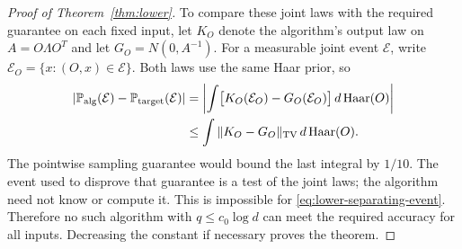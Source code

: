 \begin{proof}[Proof of Theorem~\ref{thm:lower}]
To compare these joint laws with the required guarantee on each fixed
input, let $K_O$ denote the algorithm's output law on $A=O\Lambda O^T$
and let $G_O=N(0,A^{-1})$. For a measurable joint event $\mathcal E$,
write $\mathcal E_O=\{x:(O,x)\in\mathcal E\}$. Both laws use the same
Haar prior, so
\begin{align*}
 \left|\mathbb P_{\mathrm{alg}}(\mathcal E)
       -\mathbb P_{\mathrm{target}}(\mathcal E)\right|
 &=\left|\int\bigl[K_O(\mathcal E_O)-G_O(\mathcal E_O)\bigr]
                   \,d\operatorname{Haar}(O)\right|\\
 &\le\int\|K_O-G_O\|_{\mathrm{TV}}\,d\operatorname{Haar}(O).
\end{align*}
The pointwise sampling guarantee would bound the last integral by
$1/10$. The event used to disprove that guarantee is a test of the joint
laws; the algorithm need not know or compute it.
This is impossible for \eqref{eq:lower-separating-event}. Therefore no
such algorithm with $q\le c_0\log d$ can meet the required accuracy for
all inputs. Decreasing the constant if necessary proves the theorem.
\end{proof}
